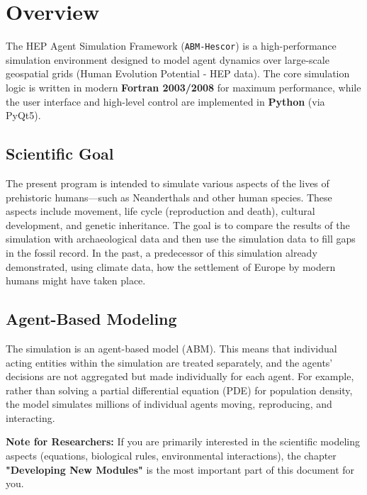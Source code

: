 \section{Overview}
The HEP Agent Simulation Framework (\texttt{ABM-Hescor}) is a high-performance simulation environment designed to model agent dynamics over large-scale geospatial grids (Human Evolution Potential - HEP data). The core simulation logic is written in modern \textbf{Fortran 2003/2008} for maximum performance, while the user interface and high-level control are implemented in \textbf{Python} (via PyQt5).

\subsection{Scientific Goal}
The present program is intended to simulate various aspects of the lives of prehistoric humans—such as Neanderthals and other human species. These aspects include movement, life cycle (reproduction and death), cultural development, and genetic inheritance.
The goal is to compare the results of the simulation with archaeological data and then use the simulation data to fill gaps in the fossil record. In the past, a predecessor of this simulation already demonstrated, using climate data, how the settlement of Europe by modern humans might have taken place.

\subsection{Agent-Based Modeling}
The simulation is an agent-based model (ABM). This means that individual acting entities within the simulation are treated separately, and the agents’ decisions are not aggregated but made individually for each agent. For example, rather than solving a partial differential equation (PDE) for population density, the model simulates millions of individual agents moving, reproducing, and interacting.

\textbf{Note for Researchers:} If you are primarily interested in the scientific modeling aspects (equations, biological rules, environmental interactions), the chapter \textbf{"Developing New Modules"} is the most important part of this document for you.

